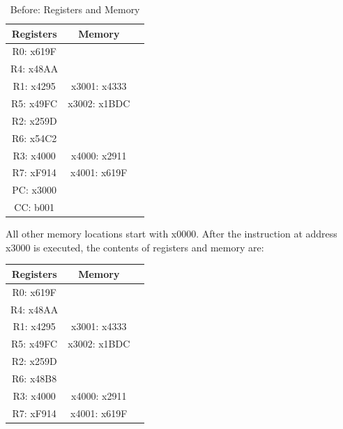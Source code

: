 \documentclass{article}
\begin{document}
\begin{enumerate}[label=(\alph*)]
\begin{enumerate}[label=(\roman*)]
\begin{table}[h]
            \centering
            \begin{tabular}{|c|c|c|}
            \hline
            \textbf{Registers} & \textbf{Memory} & \\
            \hline
            R0: x619F & & \\
            \hline
            R4: x48AA & & \\
            \hline
            R1: x4295 & x3001: x4333 & \\
            \hline
            R5: x49FC & x3002: x1BDC & \\
            \hline
            R2: x259D & & \\
            \hline
            R6: x54C2 & & \\
            \hline
            R3: x4000 & x4000: x2911 & \\
            \hline
            R7: xF914 & x4001: x619F & \\
            \hline
            PC: x3000 & & \\
            \hline
            CC: b001 & & \\
            \hline
            \end{tabular}
            \caption{Before: Registers and Memory}
            \end{table}
            \newline
            All other memory locations start with x0000. After the instruction at address x3000 is executed, the contents of registers and memory are:
            \begin{table}[h]
            \centering
            \begin{tabular}{|c|c|c|}
            \hline
            \textbf{Registers} & \textbf{Memory} & \\
            \hline
            R0: x619F & & \\
            \hline
            R4: x48AA & & \\
            \hline
            R1: x4295 & x3001: x4333 & \\
            \hline
            R5: x49FC & x3002: x1BDC & \\
            \hline
            R2: x259D & & \\
            \hline
            R6: x48B8 & & \\
            \hline
            R3: x4000 & x4000: x2911 & \\
            \hline
            R7: xF914 & x4001: x619F & \\
            \hline

\end{tabular}
\end{table}
\end{enumerate}
\end{enumerate}
\end{document}
